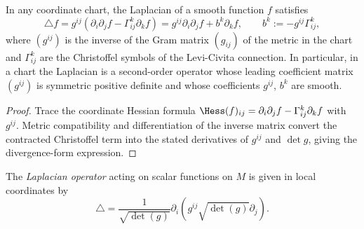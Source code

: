 \begin{lemma}
\label{lem:laplacian-christoffel-formula}
\leanok



In any coordinate chart, the Laplacian of a smooth function $f$
satisfies
\[ \triangle f
   = g^{ij}\left(\partial_i\partial_jf-\Gamma^k_{ij}\partial_kf\right)
   = g^{ij}\partial_i\partial_jf+b^k\partial_kf,
   \qquad b^k:=-g^{ij}\Gamma^k_{ij}, \]
where $(g^{ij})$ is the inverse of the Gram matrix $(g_{ij})$ of the
metric in the chart and $\Gamma^k_{ij}$ are the Christoffel symbols of
the Levi-Civita connection. In particular, in a chart the Laplacian is
a second-order operator whose leading coefficient matrix $(g^{ij})$ is
symmetric positive definite and whose coefficients $g^{ij}$, $b^k$ are
smooth.
\end{lemma}

\begin{proof}
\sketch
{}
\leanok
Trace the coordinate Hessian formula $\Hess(f)_{ij}=\partial_i\partial_jf-\Gamma^k_{ij}\partial_kf$ with $g^{ij}$. Metric compatibility and differentiation of the inverse matrix convert the contracted Christoffel term into the stated derivatives of $g^{ij}$ and $\det g$, giving the divergence-form expression.
\end{proof}

\begin{lemma}
\label{lem:laplacian-local-formula}
\leanok



The \textit{Laplacian operator} acting on scalar
functions on $M$ is given in local coordinates by
\[ \triangle  = \frac{1}{\sqrt{\det(g)}}\partial_i
\left(g^{ij}\sqrt{\det(g)}\partial_j\right). \]
\end{lemma}


